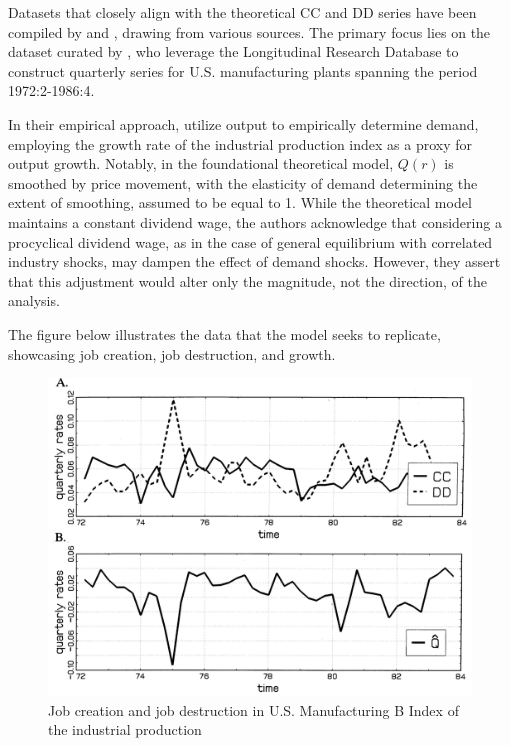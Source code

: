 \documentclass[12pt]{report}
\begin{document}
Datasets that closely align with the theoretical CC and DD series have been compiled by 
\cite{DAvHalt90, DavHalt92} and  \cite{BlaDia90}, drawing from various sources. The primary focus
lies on the dataset curated by \cite{DAvHalt90, DavHalt92}, who leverage the Longitudinal Research Database to construct
quarterly series for U.S. manufacturing plants spanning the period 1972:2-1986:4. 

In their empirical approach, \cite{DavHal94}utilize output to empirically determine demand, employing the growth
rate of the industrial production index as a proxy for output growth. Notably, in the foundational theoretical model,
\(Q(r)\) is smoothed by price movement, with the elasticity of demand determining the extent of smoothing, assumed to be
equal to 1. While the theoretical model maintains a constant dividend wage, the authors acknowledge that considering
a procyclical dividend wage, as in the case of general equilibrium with correlated industry shocks, may dampen the
effect of demand shocks. However, they assert that this adjustment would alter only the magnitude, not the direction, of
the analysis. 

The figure below illustrates the data that the model seeks to replicate, showcasing job creation, job destruction, and growth.

\begin{figure}
    \centering
    \includegraphics[scale = 0.4]{figure/Plot2.2.png}
    \caption{Job creation and job destruction in U.S. Manufacturing B Index of the industrial production}
    \label{plot:2.2}
\end{figure}
\end{document}

